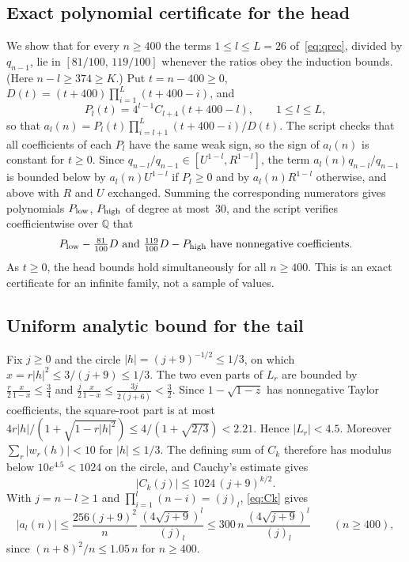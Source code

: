 \documentclass[11pt,a4paper]{article}
\theoremstyle{remark}
\begin{document}
\subsection{Exact polynomial certificate for the head}

We show that for every $n\ge400$ the terms $1\le l\le L=26$ of~\eqref{eq:qrec}, divided by $q_{n-1}$, lie in $[81/100,\,119/100]$ whenever the ratios obey the induction bounds. (Here $n-l\ge374\ge K$.) Put $t=n-400\ge0$, $D(t)=(t+400)\prod_{i=1}^{L}(t+400-i)$, and
\[
  P_l(t)=4^{l-1}C_{l+4}(t+400-l),\qquad 1\le l\le L,
\]
so that $a_l(n)=P_l(t)\prod_{i=l+1}^{L}(t+400-i)/D(t)$. The script checks that all coefficients of each $P_l$ have the same weak sign, so the sign of $a_l(n)$ is constant for $t\ge0$. Since $q_{n-l}/q_{n-1}\in[U^{1-l},R^{1-l}]$, the term $a_l(n)q_{n-l}/q_{n-1}$ is bounded below by $a_l(n)U^{1-l}$ if $P_l\ge0$ and by $a_l(n)R^{1-l}$ otherwise, and above with $R$ and $U$ exchanged. Summing the corresponding numerators gives polynomials $P_{\rm low}$, $P_{\rm high}$ of degree at most~$30$, and the script verifies coefficientwise over $\mathbb Q$ that
\[
  P_{\rm low}-\tfrac{81}{100}D\ \text{and}\ \tfrac{119}{100}D-P_{\rm high}\ \text{have nonnegative coefficients}.
\]
As $t\ge0$, the head bounds hold simultaneously for all $n\ge400$. This is an exact certificate for an infinite family, not a sample of values.

\subsection{Uniform analytic bound for the tail}

Fix $j\ge0$ and the circle $|h|=(j+9)^{-1/2}\le1/3$, on which $x=r|h|^2\le3/(j+9)\le1/3$. The two even parts of $L_r$ are bounded by $\frac r2\frac x{1-x}\le\frac34$ and $\frac j2\frac x{1-x}\le\frac{3j}{2(j+6)}<\frac32$. Since $1-\sqrt{1-z}$ has nonnegative Taylor coefficients, the square-root part is at most $4r|h|/(1+\sqrt{1-r|h|^2})\le4/(1+\sqrt{2/3})<2.21$. Hence $|L_r|<4.5$. Moreover $\sum_r|w_r(h)|<10$ for $|h|\le1/3$. The defining sum of $C_k$ therefore has modulus below $10e^{4.5}<1024$ on the circle, and Cauchy's estimate gives
\begin{equation}\label{eq:Ck}
  |C_k(j)|\le1024\,(j+9)^{k/2}.
\end{equation}
With $j=n-l\ge1$ and $\prod_{i=1}^l(n-i)=(j)_l$, \eqref{eq:Ck} gives
\[
  |a_l(n)|\le\frac{256(j+9)^2}{n}\,\frac{(4\sqrt{j+9})^l}{(j)_l}\le300\,n\,\frac{(4\sqrt{j+9})^l}{(j)_l}\qquad(n\ge400),
\]
since $(n+8)^2/n\le1.05\,n$ for $n\ge400$.
\end{document}
